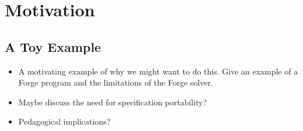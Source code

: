 \section{Motivation}

\subsection{A Toy Example}

\begin{itemize}
    \item A motivating example of why we might want to do this. Give an example of a Forge program and the limitations of the Forge solver. 
    \item Maybe discuss the need for specification portability? 
    \item Pedagogical implications? 
\end{itemize}